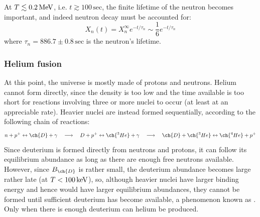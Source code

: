 
At $ T \lesssim 0.2 \,\mathrm{MeV} $, i.e. $ t \gtrsim 100 \,\text{sec} $, the finite lifetime of the neutron becomes important, and indeed neutron decay must be accounted for:
\begin{equation}
  X_n(t) = X_n^\infty e^{-t/\tau_n} \sim \frac{1}{6} e^{-t/\tau_n}
  \label{eq:neutron-decay}
\end{equation}
where $ \tau_n = 886.7 \pm 0.8 \,\text{sec} $ is the neutron's lifetime.

\subsubsection{Helium fusion}

At this point, the universe is mostly made of protons and neutrons. Helium cannot form directly, since the density is too low and the time available is too short for reactions involving three or more nuclei to occur (at least at an appreciable rate). Heavier nuclei are instead formed sequentially, according to the following chain of reactions:
\begin{equation*}
  n + p^+ \lra \ch{D} + \gamma
  \quad \longrightarrow \quad
  D + p^+ \lra \ch{^3He} + \gamma
  \quad \longrightarrow \quad
  \ch{D} + \ch{^3He} \lra \ch{^4He} + p^+
\end{equation*}
Since deuterium is formed directly from neutrons and protons, it can follow its equilibrium abundance as long as there are enough free neutrons available. However, since $ B_{\ch{D}} $ is rather small, the deuterium abundance becomes large rather late (at $ T < 100 \,\mathrm{keV} $), so, although heavier nuclei have larger binding energy and hence would have larger equilibrium abundances, they cannot be formed until sufficient deuterium has become available, a phenomenon known as . Only when there is enough deuterium can helium be produced.

